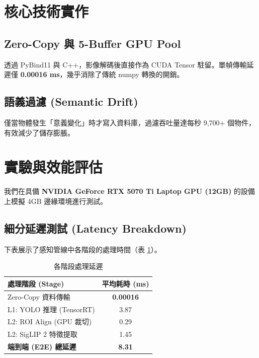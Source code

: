 \documentclass[journal, 10pt, twocolumn]{IEEEtran}
\begin{document}
\section{核心技術實作}
\subsection{Zero-Copy 與 5-Buffer GPU Pool}
透過 PyBind11 與 C++，影像解碼後直接作為 CUDA Tensor 駐留。單幀傳輸延遲僅 \textbf{0.00016 ms}，幾乎消除了傳統 numpy 轉換的開銷。

\subsection{語義過濾 (Semantic Drift)}
僅當物體發生「意義變化」時才寫入資料庫，過濾吞吐量達每秒 9,700+ 個物件，有效減少了儲存膨脹。

\section{實驗與效能評估}
我們在具備 \textbf{NVIDIA GeForce RTX 5070 Ti Laptop GPU (12GB)} 的設備上模擬 4GB 邊緣環境進行測試。

\subsection{細分延遲測試 (Latency Breakdown)}
下表展示了感知管線中各階段的處理時間（表 \ref{tab:latency}）。
\begin{table}[h]
\caption{各階段處理延遲}
\label{tab:latency}
\centering
\begin{tabular}{@{}lc@{}}
\toprule
處理階段 (Stage) & 平均耗時 (ms) \\ \midrule
Zero-Copy 資料傳輸 & \textbf{0.00016} \\
L1: YOLO 推理 (TensorRT) & 3.87 \\
L2: ROI Align (GPU 裁切) & 0.29 \\
L2: SigLIP 2 特徵提取 & 1.45 \\ \midrule
\textbf{端到端 (E2E) 總延遲} & \textbf{8.31} \\ \bottomrule
\end{tabular}
\end{table}
\end{document}
